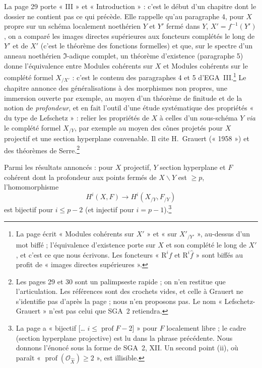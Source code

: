\documentclass[11pt,a4paper]{article}
\begin{document}
La page 29 porte « III » et « Introduction » : c'est le début d'un chapitre
dont le dossier ne contient pas ce qui précède. Elle rappelle qu'au
paragraphe 4, pour $X$ propre sur un schéma localement noethérien $Y$
et $Y'$ fermé dans $Y$, $X' = f^{-1}(Y')$, on a comparé les images directes
supérieures aux foncteurs complétés le long de $Y'$ et de $X'$ (c'est le
théorème des fonctions formelles) et que, sur le spectre d'un anneau
noethérien $\mathfrak{I}$-adique complet, un théorème d'existence (paragraphe
5) donne l'équivalence entre Modules cohérents sur $X$ et Modules cohérents
sur le complété formel $X_{/X'}$ : c'est le contenu des paragraphes 4 et 5
d'EGA~III.\footnote{La page écrit « Modules cohérents sur $X'$ » et « sur
$X'_{/Y'}$ », au-dessus d'un mot biffé ; l'équivalence d'existence porte sur
$X$ et son complété le long de $X'$, et c'est ce que nous écrivons. Les
foncteurs « $\mathrm{R}^i f$ et $\mathrm{R}^i \hat{f}$ » sont biffés au profit
de « images directes supérieures ».} Le chapitre annonce des
généralisations à des morphismes non propres, une immersion ouverte par
exemple, au moyen d'un théorème de finitude et de la notion de
\emph{profondeur}, et en fait l'outil d'une étude systématique des propriétés
« du type de Lefschetz » : relier les propriétés de $X$ à celles d'un
sous-schéma $Y$ \emph{via} le complété formel $X_{/Y}$, par exemple au moyen des cônes
projetés pour $X$ projectif et une section hyperplane convenable. Il cite
H.~Grauert
(« 1958 ») et des théorèmes de Serre.\footnote{Les pages 29 et 30 sont un
palimpseste rapide ; on n'en restitue que l'articulation. Les références sont
des crochets vides, et celle à Grauert ne s'identifie pas d'après la page ;
nous n'en proposons pas. Le nom « Lefschetz-Grauert » n'est pas celui que
SGA~2 retiendra.}

Parmi les résultats annoncés : pour $X$ projectif, $Y$ section hyperplane et
$F$ cohérent dont la profondeur aux points fermés de $X \smallsetminus Y$ est
$\geq p$, l'homomorphisme
\[
  H^i(X, F) \longrightarrow H^i(X_{/Y}, F_{/Y})
\]
est bijectif pour $i \leq p - 2$ (et injectif pour $i = p-1$).\footnote{La page
a « bijectif [… $i \leq \operatorname{prof} F - 2$] » pour $F$ localement
libre ; le cadre (section hyperplane projective) est lu dans la phrase
précédente. Nous donnons l'énoncé sous la forme de SGA~2, XII. Un second
point (ii), où paraît « $\operatorname{prof}(\mathcal{O}_{\widehat{X}}) \geq
2$ », est illisible.}
\end{document}
